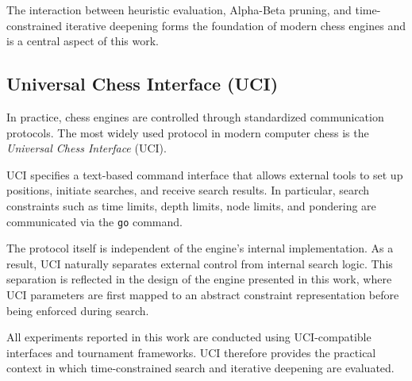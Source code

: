 The interaction between heuristic evaluation, Alpha-Beta pruning, and
time-constrained iterative deepening forms the foundation of modern chess
engines and is a central aspect of this work.

\subsection{Universal Chess Interface (UCI)}
\label{subsec:uci}

In practice, chess engines are controlled through standardized communication
protocols. The most widely used protocol in modern computer chess is the
\emph{Universal Chess Interface} (UCI).

UCI specifies a text-based command interface that allows external tools to set up
positions, initiate searches, and receive search results. In particular, search
constraints such as time limits, depth limits, node limits, and pondering are
communicated via the \texttt{go} command.

The protocol itself is independent of the engine’s internal implementation. As a
result, UCI naturally separates external control from internal search logic.
This separation is reflected in the design of the engine presented in this work,
where UCI parameters are first mapped to an abstract constraint representation
before being enforced during search.

All experiments reported in this work are conducted using UCI-compatible
interfaces and tournament frameworks. UCI therefore provides the practical
context in which time-constrained search and iterative deepening are evaluated.